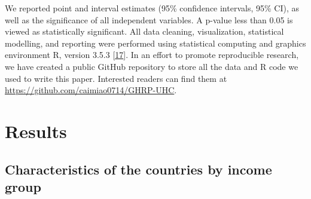 \documentclass[]{elsarticle} %
\begin{document}
We reported point and interval estimates (95\% confidence intervals, 95\% CI), as well as the significance of all independent variables.
A p-value less than 0.05 is viewed as statistically significant.
All data cleaning, visualization, statistical modelling, and reporting were performed using statistical computing and graphics environment R, version 3.5.3 {[}\protect\hyperlink{ref-R353}{17}{]}.
In an effort to promote reproducible research, we have created a public GitHub repository to store all the data and R code we used to write this paper.
Interested readers can find them at \url{https://github.com/caimiao0714/GHRP-UHC}.

\hypertarget{results}{%
\section{Results}\label{results}}

\hypertarget{characteristics-of-the-countries-by-income-group}{%
\subsection{Characteristics of the countries by income group}\label{characteristics-of-the-countries-by-income-group}}

\begin{table}[t]

\caption{\label{tab:descriptive}Characteristics of the 184 countries by income group, 2000 - 2016}
\centering
{}
\end{table}
\end{document}
